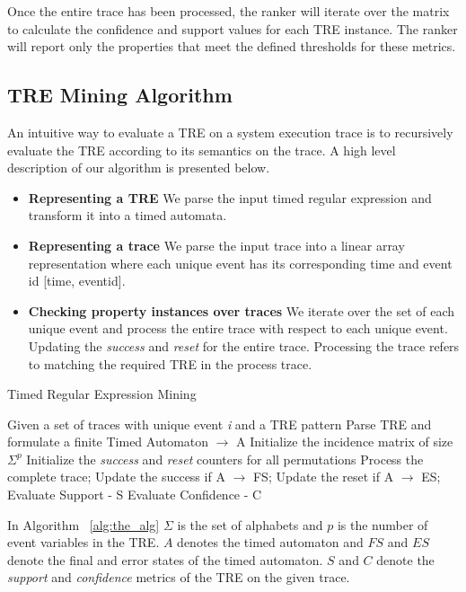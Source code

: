 \documentclass[]{sigplanconf}
\begin{document}
Once the entire trace has been processed, the ranker will iterate over the matrix to calculate the confidence and support values for each TRE instance. The ranker will report only the properties that meet the defined thresholds for these metrics.

\subsection{TRE Mining Algorithm}

An intuitive way to evaluate a TRE on a system execution trace is to recursively evaluate the TRE according to its semantics on the trace. A high level description of our algorithm is presented below.

\begin{itemize}
\item \textbf{Representing a TRE} We parse the input timed regular expression and transform it into a timed automata.
\item \textbf{Representing a trace} We parse the input trace into a  linear array representation where each unique event has its corresponding time and event id [time, eventid].
\item \textbf{Checking property instances over traces} We iterate over the set of each unique event and process the entire trace with respect to each unique event. Updating the \emph{success} and \emph{reset} for the entire trace. Processing the trace refers to matching the required TRE in the process trace.
\end{itemize}


\begin{algorithm}[h]
    \caption{Timed Regular Expression Mining}\label{alg:the_alg}
    \begin{algorithmic}[1]
     \Require  Given a set of traces with unique event \emph{i} and a TRE pattern
     \Ensure Parse TRE and formulate a finite Timed Automaton $\rightarrow$ A
     \State Initialize the incidence matrix of size $\Sigma^p$
     \State Initialize the \emph{success} and \emph{reset} counters for all permutations
        \State Process the complete trace;
        \State Update the success if A $\rightarrow$ FS;
        \State Update the reset if A $\rightarrow$ ES;
     \EndFor
     \State Evaluate Support - S
     \State Evaluate Confidence - C
    \end{algorithmic}
\end{algorithm}

In Algorithm ~\ref{alg:the_alg} $\Sigma$ is the set of alphabets and $p$ is the number of event variables in the TRE. $A$ denotes the timed automaton and $FS$ and $ES$ denote the final and error states of the timed automaton. $S$ and $C$ denote the \emph{support} and \emph{confidence} metrics of the TRE on the given trace.
\end{document}
